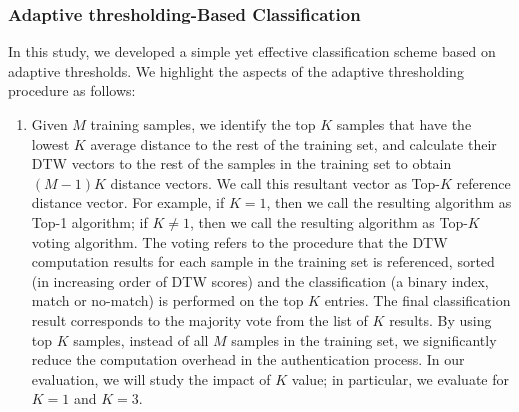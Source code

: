 \subsubsection{Adaptive thresholding-Based Classification}
\fi
In this study, we developed a simple yet effective classification scheme based on adaptive thresholds. We highlight the aspects of the adaptive thresholding procedure as follows:

\begin{enumerate}

\item Given $M$ training samples, we identify the top $K$ samples that have 
the lowest $K$ average distance to the rest of the
training set, and calculate their DTW vectors to the rest of the samples in 
the training set to obtain $(M-1)K$ distance vectors. We call this resultant 
vector as Top-$K$ reference distance vector. For example, if $K = 1$, then we 
call the resulting algorithm as Top-1 algorithm; if $K \neq 1$, then we call 
the resulting algorithm as Top-$K$ voting algorithm.
The voting refers to the procedure that the DTW computation results for each 
sample in the training set is referenced, sorted (in increasing order of DTW 
scores) and the classification (a binary index, match or no-match) is 
performed on the top $K$ entries. The final classification result corresponds 
to the majority vote from the list of $K$ results.
By using top $K$ samples, instead of all $M$ samples in the training set, we 
significantly reduce the computation overhead in the authentication 
process. In our evaluation, we will study the impact of $K$ value; in 
particular, we evaluate for $K = 1$ and $K = 3$.


\end{enumerate}
